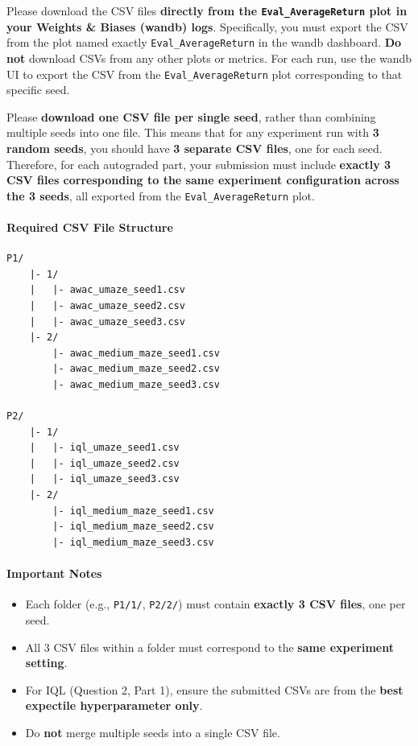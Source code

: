 \documentclass[12pt]{article}
\begin{document}
Please download the CSV files \textbf{directly from the \texttt{Eval\_AverageReturn} plot in your Weights \& Biases (wandb) logs}. Specifically, you must export the CSV from the plot named exactly \texttt{Eval\_AverageReturn} in the wandb dashboard. \textbf{Do not} download CSVs from any other plots or metrics. For each run, use the wandb UI to export the CSV from the \texttt{Eval\_AverageReturn} plot corresponding to that specific seed. 

Please \textbf{download one CSV file per single seed}, rather than combining multiple seeds into one file. This means that for any experiment run with \textbf{3 random seeds}, you should have \textbf{3 separate CSV files}, one for each seed. Therefore, for each autograded part, your submission must include \textbf{exactly 3 CSV files corresponding to the same experiment configuration across the 3 seeds}, all exported from the \texttt{Eval\_AverageReturn} plot.

\paragraph{Required CSV File Structure}

\begin{verbatim}
P1/
    |- 1/
    |   |- awac_umaze_seed1.csv
    |   |- awac_umaze_seed2.csv
    |   |- awac_umaze_seed3.csv
    |- 2/
        |- awac_medium_maze_seed1.csv
        |- awac_medium_maze_seed2.csv
        |- awac_medium_maze_seed3.csv

P2/
    |- 1/
    |   |- iql_umaze_seed1.csv
    |   |- iql_umaze_seed2.csv
    |   |- iql_umaze_seed3.csv
    |- 2/
        |- iql_medium_maze_seed1.csv
        |- iql_medium_maze_seed2.csv
        |- iql_medium_maze_seed3.csv
\end{verbatim}

\paragraph{Important Notes}
\begin{itemize}
    \item Each folder (e.g., \texttt{P1/1/}, \texttt{P2/2/}) must contain \textbf{exactly 3 CSV files}, one per seed.
    \item All 3 CSV files within a folder must correspond to the \textbf{same experiment setting}.
    \item For IQL (Question 2, Part 1), ensure the submitted CSVs are from the \textbf{best expectile hyperparameter only}.
    \item Do \textbf{not} merge multiple seeds into a single CSV file.
\end{itemize}
\end{document}
